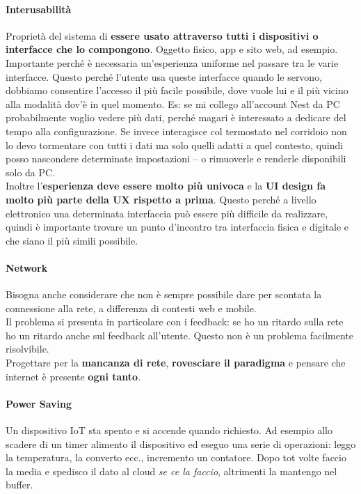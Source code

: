 \documentclass[10pt]{article}
\begin{document}
\paragraph{Interusabilità} Proprietà del sistema di \textbf{essere usato attraverso tutti i dispositivi o interfacce che lo compongono}. Oggetto fisico, app e sito web, ad esempio.\\
Importante perché è necessaria un'esperienza uniforme nel passare tra le varie interfacce. Questo perché l'utente usa queste interfacce quando le servono, dobbiamo consentire l'accesso il più facile possibile, dove vuole lui e il più vicino alla modalità dov'è in quel momento. Es: se mi collego all'account Nest da PC probabilmente voglio vedere più dati, perché magari è interessato a dedicare del tempo alla configurazione. Se invece interagisce col termostato nel corridoio non lo devo tormentare con tutti i dati ma solo quelli adatti a quel contesto, quindi posso nascondere determinate impostazioni -- o rimuoverle e renderle disponibili solo da PC.\\
Inoltre l'\textbf{esperienza deve essere molto più univoca} e la \textbf{UI design fa molto più parte della UX rispetto a prima}. Questo perché a livello elettronico una determinata interfaccia può essere più difficile da realizzare, quindi è importante trovare un punto d'incontro tra interfaccia fisica e digitale e che siano il più simili possibile.
\paragraph{Network} Bisogna anche considerare che non è sempre possibile dare per scontata la connessione alla rete, a differenza di contesti web e mobile.\\
Il problema si presenta in particolare con i feedback: se ho un ritardo sulla rete ho un ritardo anche sul feedback all'utente. Questo non è un problema facilmente risolvibile.\\
Progettare per la \textbf{mancanza di rete}, \textbf{rovesciare il paradigma} e pensare che internet è presente \textbf{ogni tanto}.
\paragraph{Power Saving} Un dispositivo IoT sta spento e si accende quando richiesto. Ad esempio allo scadere di un timer alimento il dispositivo ed eseguo una serie di operazioni: leggo la temperatura, la converto ecc., incremento un contatore. Dopo tot volte faccio la media e spedisco il dato al cloud \textit{se ce la faccio}, altrimenti la mantengo nel buffer. 
\end{document}
